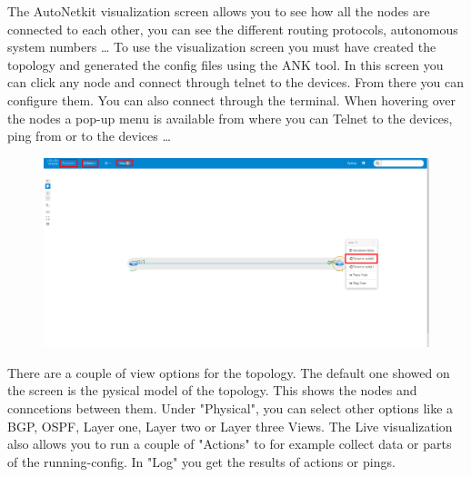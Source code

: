 \documentclass{article}
\begin{document}
\newpage
The AutoNetkit visualization screen allows you to see how all the nodes are connected to each other, you can see the different routing protocols, autonomous system numbers \dots
To use the visualization screen you must have created the topology and generated the config files using the ANK tool.
In this screen you can click any node and connect through telnet to the devices.
From there you can configure them.
You can also connect through the terminal.
When hovering over the nodes a pop-up menu is available from where you can Telnet to the devices, ping from or to the devices \dots

\begin{figure}[H]
	\centering
	\includegraphics[width=\textwidth]{images/Connect_to_router.png}
\end{figure}

There are a couple of view options for the topology.
The default one showed on the screen is the pysical model of the topology.
This shows the nodes and conncetions between them.
Under "Physical", you can select other options like a BGP, OSPF, Layer one, Layer two or Layer three Views.
The Live visualization also allows you to run a couple of "Actions" to for example collect data or parts of the running-config.
In "Log" you get the results of actions or pings.
\end{document}
